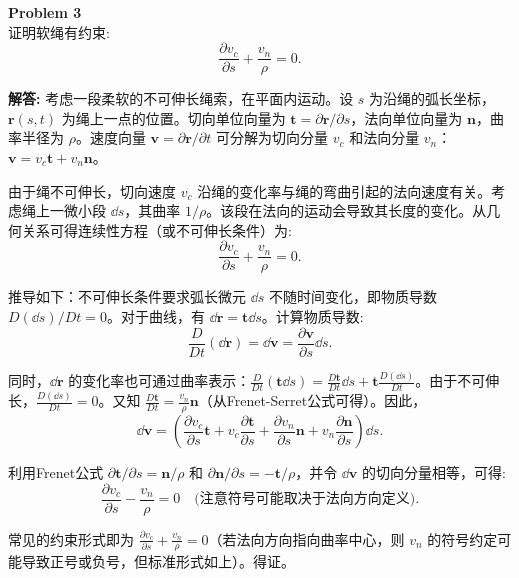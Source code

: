 \documentclass[12pt, a4paper, oneside]{ctexart}
\newenvironment{solution}{\par\noindent\textbf{解答:}\quad}{\par}
\begin{document}
\begin{mdframed}[backgroundcolor=gray!10, linewidth=0pt]
    \textbf{Problem 3} \\
    证明软绳有约束:
    \[
    \frac{\partial v_c}{\partial s} + \frac{v_n}{\rho} = 0.
    \]
\end{mdframed}
\begin{solution}
    考虑一段柔软的不可伸长绳索，在平面内运动。设 \(s\) 为沿绳的弧长坐标，\(\mathbf{r}(s, t)\) 为绳上一点的位置。切向单位向量为 \(\mathbf{t} = \partial \mathbf{r} / \partial s\)，法向单位向量为 \(\mathbf{n}\)，曲率半径为 \(\rho\)。速度向量 \(\mathbf{v} = \partial \mathbf{r} / \partial t\) 可分解为切向分量 \(v_c\) 和法向分量 \(v_n\)：\(\mathbf{v} = v_c \mathbf{t} + v_n \mathbf{n}\)。
    
    由于绳不可伸长，切向速度 \(v_c\) 沿绳的变化率与绳的弯曲引起的法向速度有关。考虑绳上一微小段 \(\dd s\)，其曲率 \(1/\rho\)。该段在法向的运动会导致其长度的变化。从几何关系可得连续性方程（或不可伸长条件）为:
    \[
    \frac{\partial v_c}{\partial s} + \frac{v_n}{\rho} = 0.
    \]
    
    推导如下：不可伸长条件要求弧长微元 \(\dd s\) 不随时间变化，即物质导数 \(D(\dd s)/Dt = 0\)。对于曲线，有 \(\dd \mathbf{r} = \mathbf{t} \dd s\)。计算物质导数:
    \[
    \frac{D}{Dt} (\dd \mathbf{r}) = \dd \mathbf{v} = \frac{\partial \mathbf{v}}{\partial s} \dd s.
    \]
    
    同时，\(\dd \mathbf{r}\) 的变化率也可通过曲率表示：\(\frac{D}{Dt} (\mathbf{t} \dd s) = \frac{D\mathbf{t}}{Dt} \dd s + \mathbf{t} \frac{D(\dd s)}{Dt}\)。由于不可伸长，\(\frac{D(\dd s)}{Dt} = 0\)。又知 \(\frac{D\mathbf{t}}{Dt} = \frac{v_n}{\rho} \mathbf{n}\)（从Frenet-Serret公式可得）。因此，
    \[
    \dd \mathbf{v} = \left( \frac{\partial v_c}{\partial s} \mathbf{t} + v_c \frac{\partial \mathbf{t}}{\partial s} + \frac{\partial v_n}{\partial s} \mathbf{n} + v_n \frac{\partial \mathbf{n}}{\partial s} \right) \dd s.
    \]
    
    利用Frenet公式 \(\partial \mathbf{t} / \partial s = \mathbf{n}/\rho\) 和 \(\partial \mathbf{n} / \partial s = -\mathbf{t}/\rho\)，并令 \(\dd \mathbf{v}\) 的切向分量相等，可得:
    \[
    \frac{\partial v_c}{\partial s} - \frac{v_n}{\rho} = 0 \quad \text{(注意符号可能取决于法向方向定义)}.
    \]
    
    常见的约束形式即为 \(\frac{\partial v_c}{\partial s} + \frac{v_n}{\rho} = 0\)（若法向方向指向曲率中心，则 \(v_n\) 的符号约定可能导致正号或负号，但标准形式如上）。得证。
\end{solution}
\end{document}
